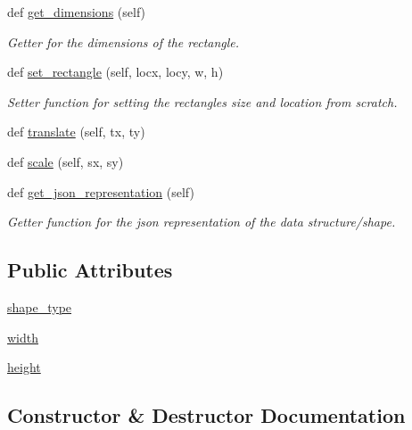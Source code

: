 \begin{DoxyCompactItemize}
def \mbox{\hyperlink{classbridges_1_1rectangle_1_1_rectangle_a3f3823c7058ee639a92494276c2c9f22}{get\+\_\+dimensions}} (self)
\begin{DoxyCompactList}\small\item\em Getter for the dimensions of the rectangle. \end{DoxyCompactList}\item 
def \mbox{\hyperlink{classbridges_1_1rectangle_1_1_rectangle_a187376dcdc5c10c5b1ce5f3f00a80961}{set\+\_\+rectangle}} (self, locx, locy, w, h)
\begin{DoxyCompactList}\small\item\em Setter function for setting the rectangles size and location from scratch. \end{DoxyCompactList}\item 
def \mbox{\hyperlink{classbridges_1_1rectangle_1_1_rectangle_aa032816d119516e90a4237cd979a5d41}{translate}} (self, tx, ty)
\item 
def \mbox{\hyperlink{classbridges_1_1rectangle_1_1_rectangle_af540e714f768efb6142310047fffc8c7}{scale}} (self, sx, sy)
\item 
def \mbox{\hyperlink{classbridges_1_1rectangle_1_1_rectangle_abed807aa2b797312357395f874577a64}{get\+\_\+json\+\_\+representation}} (self)
\begin{DoxyCompactList}\small\item\em Getter function for the json representation of the data structure/shape. \end{DoxyCompactList}\end{DoxyCompactItemize}
\subsection*{Public Attributes}
\begin{DoxyCompactItemize}
\item 
\mbox{\hyperlink{classbridges_1_1rectangle_1_1_rectangle_acd8a51dab1da86bd859fb47fb7ab1884}{shape\+\_\+type}}
\item 
\mbox{\hyperlink{classbridges_1_1rectangle_1_1_rectangle_ac70360e861fb0dfab5fae8525ffc86ba}{width}}
\item 
\mbox{\hyperlink{classbridges_1_1rectangle_1_1_rectangle_a3b7a2448881d5eea95e86aac8dfae467}{height}}
\end{DoxyCompactItemize}


\subsection{Constructor \& Destructor Documentation}
\mbox{\label{classbridges_1_1rectangle_1_1_rectangle_aad5cb2fdd1da2686fb67de2150f55d42}} 
